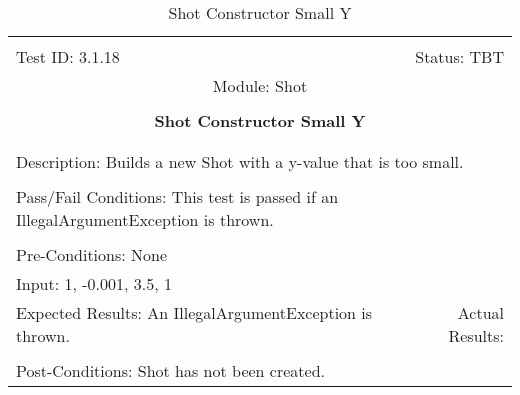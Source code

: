 \documentclass[titlepage]{article}
\begin{document}
\begin{center}%
\begin{table}[h!]
\begin{tabular}{|l r|}\hline&\\[-2mm]
	Test ID: 3.1.18	&Status: TBT\\[-3mm]
	\multicolumn{2}{|c|}{Module: Shot}\\&\\
	\multicolumn{2}{|c|}{\textbf{\large{Shot Constructor Small Y}}}\\&\\\hline&\\[-3mm]
	\multicolumn{2}{|p{\textwidth}|}{Description: Builds a new Shot with a y-value that is too small.}\\[1mm]\hline&\\[-3mm]
	\multicolumn{2}{|p{\textwidth}|}{Pass/Fail Conditions: This test is passed if an IllegalArgumentException is thrown.}\\[1mm]\hline&\\[-3mm]
	\multicolumn{2}{|p{\textwidth}|}{Pre-Conditions: None}\\[4mm]
	\multicolumn{2}{|p{\textwidth}|}{Input: 1, -0.001, 3.5, 1}\\[2mm]\hline
	\multicolumn{1}{|p{0.49\textwidth}}{Expected Results: An IllegalArgumentException is thrown.}	&\multicolumn{1}{|p{0.45\textwidth}|}{Actual Results: }\\\hline&\\[-3mm]
	\multicolumn{2}{|p{\textwidth}|}{Post-Conditions: Shot has not been created.}\\\hline
\end{tabular}
\caption{Shot Constructor Small Y}
\end{table}
\end{center}
\end{document}
